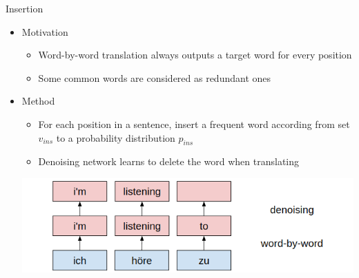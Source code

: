\documentclass[11pt, a4paper, landscape]{article}
\begin{document}
\vfill

\NewPage
{}	
\vfill	
Insertion
\begin{itemize}
	\item Motivation
	\begin{itemize}
		\item Word-by-word translation always outputs a target word for every position
		\item Some common words are considered as redundant ones
	\end{itemize}
	\item Method
	\begin{itemize}
		\item For each position in a sentence, insert a frequent word according from set ${v_{ins}}$ to a probability distribution ${p_{ins}}$
		\item Denoising network learns to delete the word when translating
	\end{itemize}
	\begin{center}
		\vspace{0.5em}
		\hspace{-1cm}\includegraphics[width=0.8\linewidth]{insertion}
	\end{center}\vspace{0.5em}	
\end{itemize}

\vfill
\end{document}
